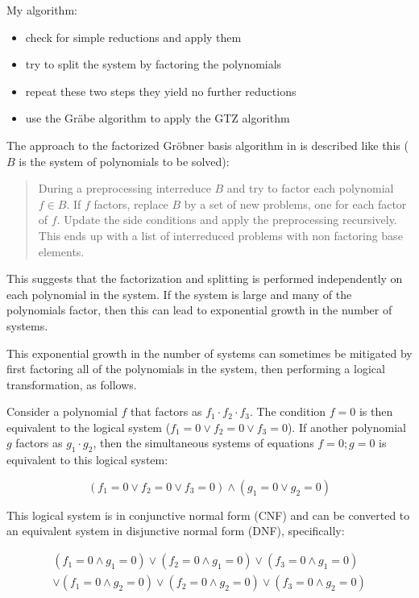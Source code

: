 \documentclass{article}
\begin{document}
My algorithm:

\begin{itemize}
\item check for simple reductions and apply them
\item try to split the system by factoring the polynomials
\item repeat these two steps they yield no further reductions
\item use the Gr\"abe algorithm to apply the GTZ algorithm
\end{itemize}

The approach to the factorized Gr\"obner basis algorithm in \cite{Grabe06}
is described like this ($B$ is the system of polynomials to be solved):

\begin{quote}
During a preprocessing interreduce $B$ and try to factor each polynomial $f \in B$. If $f$ factors,
replace $B$ by a set of new problems, one for each factor of $f$. Update the side conditions
and apply the preprocessing recursively. This ends up with a list of interreduced problems
with non factoring base elements.
\end{quote}

This suggests that the factorization and splitting is performed independently on each
polynomial in the system.  If the system is large and many of the polynomials factor,
then this can lead to exponential growth in the number of systems.

This exponential growth in the number of systems can sometimes be mitigated
by first factoring all of the polynomials in the system, then performing
a logical transformation, as follows.

Consider a polynomial $f$ that factors as $f_1\cdot f_2\cdot f_3$.
The condition $f=0$ is then equivalent to the logical system ($f_1=0 \vee f_2=0 \vee f_3=0$).
If another polynomial $g$ factors as $g_1 \cdot g_2$, then the simultaneous
systems of equations $f=0; g=0$ is equivalent to this logical system:

\begin{equation}
(f_1=0 \vee f_2=0 \vee f_3=0) \wedge (g_1 = 0 \vee g_2 = 0)
\end{equation}

This logical system is in conjunctive normal form (CNF) and can be
converted to an equivalent system in disjunctive normal form (DNF), specifically:

\begin{equation}
\begin{split}
(f_1=0 \wedge g_1 = 0) \vee (f_2=0 \wedge g_1 = 0) \vee (f_3=0 \wedge g_1 = 0) \\
\vee (f_1=0 \wedge g_2 = 0) \vee (f_2=0 \wedge g_2 = 0) \vee (f_3=0 \wedge g_2 = 0)
\end{split}
\end{equation}
\end{document}
